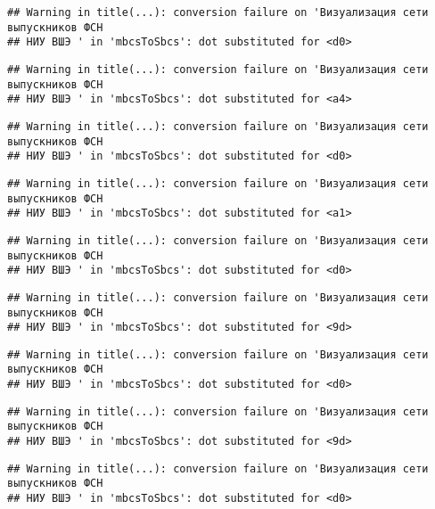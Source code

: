 \documentclass[
]{article}
\begin{document}
\begin{verbatim}
## Warning in title(...): conversion failure on 'Визуализация сети выпускников ФСН
## НИУ ВШЭ ' in 'mbcsToSbcs': dot substituted for <d0>
\end{verbatim}

\begin{verbatim}
## Warning in title(...): conversion failure on 'Визуализация сети выпускников ФСН
## НИУ ВШЭ ' in 'mbcsToSbcs': dot substituted for <a4>
\end{verbatim}

\begin{verbatim}
## Warning in title(...): conversion failure on 'Визуализация сети выпускников ФСН
## НИУ ВШЭ ' in 'mbcsToSbcs': dot substituted for <d0>
\end{verbatim}

\begin{verbatim}
## Warning in title(...): conversion failure on 'Визуализация сети выпускников ФСН
## НИУ ВШЭ ' in 'mbcsToSbcs': dot substituted for <a1>
\end{verbatim}

\begin{verbatim}
## Warning in title(...): conversion failure on 'Визуализация сети выпускников ФСН
## НИУ ВШЭ ' in 'mbcsToSbcs': dot substituted for <d0>
\end{verbatim}

\begin{verbatim}
## Warning in title(...): conversion failure on 'Визуализация сети выпускников ФСН
## НИУ ВШЭ ' in 'mbcsToSbcs': dot substituted for <9d>
\end{verbatim}

\begin{verbatim}
## Warning in title(...): conversion failure on 'Визуализация сети выпускников ФСН
## НИУ ВШЭ ' in 'mbcsToSbcs': dot substituted for <d0>
\end{verbatim}

\begin{verbatim}
## Warning in title(...): conversion failure on 'Визуализация сети выпускников ФСН
## НИУ ВШЭ ' in 'mbcsToSbcs': dot substituted for <9d>
\end{verbatim}

\begin{verbatim}
## Warning in title(...): conversion failure on 'Визуализация сети выпускников ФСН
## НИУ ВШЭ ' in 'mbcsToSbcs': dot substituted for <d0>
\end{verbatim}
\end{document}

